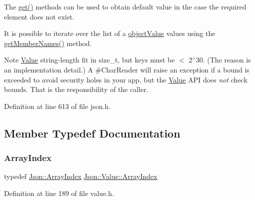 The \hyperlink{class_json_1_1_value_a034eb7bf85a44fa759bdaa232788ca66}{get()} methods can be used to obtain default value in the case the required element does not exist.

It is possible to iterate over the list of a \hyperlink{namespace_json_a7d654b75c16a57007925868e38212b4ea6ca35c0a30ea3d1b8ec95c2d1e41a1a8}{object\+Value} values using the \hyperlink{class_json_1_1_value_a79d7725dce6260317333e69022367ac9}{get\+Member\+Names()} method.

\begin{DoxyNote}{Note}
\hyperlink{class_json_1_1_value_ada6ba1369448fb0240bccc36efaa46f7}{Value} string-\/length fit in size\+\_\+t, but keys must be $<$ 2$^\wedge$30. (The reason is an implementation detail.) A \#\+Char\+Reader will raise an exception if a bound is exceeded to avoid security holes in your app, but the \hyperlink{class_json_1_1_value}{Value} A\+PI does {\itshape not} check bounds. That is the responsibility of the caller. 
\end{DoxyNote}


Definition at line 613 of file json.\+h.



\subsection{Member Typedef Documentation}
\hypertarget{class_json_1_1_value_a184a91566cccca7b819240f0d5561c7d}{}\label{class_json_1_1_value_a184a91566cccca7b819240f0d5561c7d} 
\subsubsection{\texorpdfstring{Array\+Index}{ArrayIndex}\hspace{0.1cm}{\footnotesize\ttfamily [1/2]}}
{\footnotesize\ttfamily typedef \hyperlink{namespace_json_a8048e741f2177c3b5d9ede4a5b8c53c2}{Json\+::\+Array\+Index} \hyperlink{class_json_1_1_value_a184a91566cccca7b819240f0d5561c7d}{Json\+::\+Value\+::\+Array\+Index}}



Definition at line 189 of file value.\+h.

\hypertarget{class_json_1_1_value_a184a91566cccca7b819240f0d5561c7d}{}\label{class_json_1_1_value_a184a91566cccca7b819240f0d5561c7d} 
